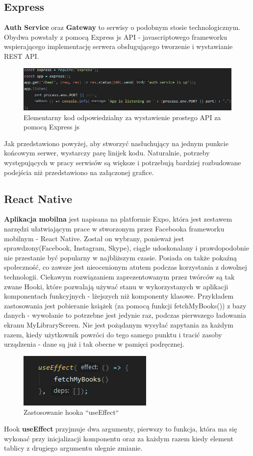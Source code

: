 \subsection{Express}
\textbf{Auth Service} oraz \textbf{Gateway} to serwisy o podobnym stosie technologicznym. Obydwa powstały z pomocą Express js API - javascriptowego frameworku wspierającego implementację serwera obsługującego tworzenie i wystawianie REST API.
\begin{figure}[H]
	\centering
	\includegraphics[width=\linewidth]{express_simple.png}
	\caption{Elementarny kod odpowiedzialny za wystawienie prostego API za pomocą Express js}
\end{figure}
Jak przedstawiono powyżej, aby stworzyć nasłuchujący na jednym punkcie końcowym serwer, wystarczy parę linijek kodu. Naturalnie, potrzeby występujących w pracy serwisów są większe i potrzebują bardziej rozbudowane podejścia niż przedstawiono na załączonej grafice.

\subsection{React Native}
\textbf{Aplikacja mobilna} jest napisana na platformie Expo, która jest zestawem narzędzi ułatwiającym prace w stworzonym przez Facebooka frameworku mobilnym - React Native. Został on wybrany, ponieważ jest sprawdzony(Facebook, Instagram, Skype), ciągle udoskonalany i prawdopodobnie nie przestanie być popularny w najbliższym czasie. Posiada on także pokaźną społeczność, co zawsze jest nieocenionym atutem podczas korzystania z dowolnej technologii.
Ciekawym rozwiązaniem zaprezentowanym przez twórców są tak zwane Hooki, które pozwalają używać stanu w wykorzystanych w aplikacji komponentach funkcyjnych - lżejszych niż komponenty klasowe.
Przykładem zastosowania jest pobieranie książek (za pomocą funkcji fetchMyBooks()) z bazy danych - wywołanie to potrzebne jest jedynie raz, podczas pierwszego ładowania ekranu MyLibraryScreen. Nie jest pożądanym wysyłać zapytania za każdym razem, kiedy użytkownik powróci do tego samego punktu i tracić zasoby urządzenia - dane są już i tak obecne w pamięci podręcznej. 
\begin{figure}[H]
	\centering
	\includegraphics{hook.png}
	\caption{Zastosowanie hooka ``useEffect``}
\end{figure}
Hook \textbf{useEffect} przyjmuje dwa argumenty, pierwszy to funkcja, która ma się wykonać przy inicjalizacji komponentu oraz za każdym razem kiedy element tablicy z drugiego argumentu ulegnie zmianie.

